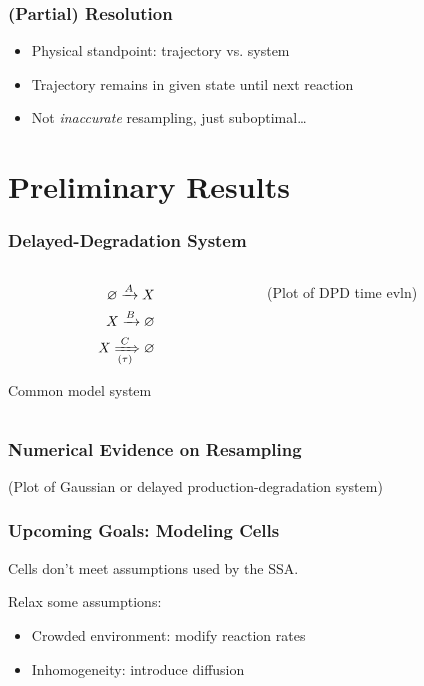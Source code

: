 \documentclass[xcolor={usenames,dvipsnames,svgnames}]{beamer}
\begin{document}
\begin{frame}
    \frametitle{(Partial) Resolution}
    \begin{itemize}
        \item Physical standpoint: trajectory vs. system
        \item Trajectory remains in given state until next reaction
        \item Not \emph{inaccurate} resampling, just suboptimal\ldots
    \end{itemize}
\end{frame}


\section{Preliminary Results}

\begin{frame}
    \frametitle{Delayed-Degradation System}
    \begin{columns}[c]
        \begin{column}{0.5\textwidth}
            \begin{align*}
                \varnothing \xrightarrow{A} X \\
                X \xrightarrow{B} \varnothing \\
                X \xRightarrow[(\tau)]{C} \varnothing
            \end{align*}

            Common model system
        \end{column}
        \begin{column}{0.5\textwidth}
            (Plot of DPD time evln)
        \end{column}
    \end{columns}
\end{frame}

\begin{frame}
    \frametitle{Numerical Evidence on Resampling}
    (Plot of Gaussian or delayed production-degradation system)
\end{frame}


\begin{frame}
    \frametitle{Upcoming Goals: Modeling Cells}
    Cells don't meet assumptions used by the SSA.

    Relax some assumptions:
    \begin{itemize}
        \item Crowded environment: modify reaction rates
        \item Inhomogeneity: introduce diffusion
    \end{itemize}
\end{frame}
\end{document}
